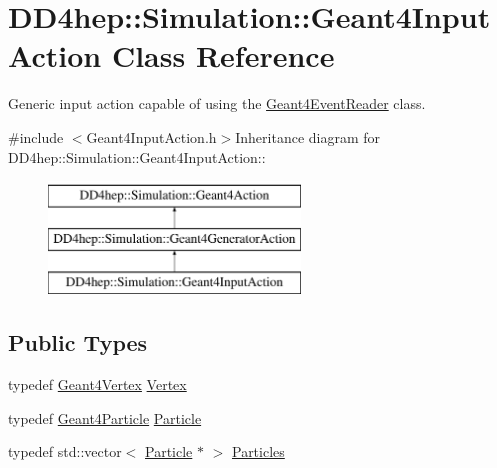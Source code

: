 \hypertarget{class_d_d4hep_1_1_simulation_1_1_geant4_input_action}{
\section{DD4hep::Simulation::Geant4InputAction Class Reference}
\label{class_d_d4hep_1_1_simulation_1_1_geant4_input_action}
}


Generic input action capable of using the \hyperlink{class_d_d4hep_1_1_simulation_1_1_geant4_event_reader}{Geant4EventReader} class.  


{\ttfamily \#include $<$Geant4InputAction.h$>$}Inheritance diagram for DD4hep::Simulation::Geant4InputAction::\begin{figure}[H]
\begin{center}
\leavevmode
\includegraphics[height=3cm]{class_d_d4hep_1_1_simulation_1_1_geant4_input_action}
\end{center}
\end{figure}
\subsection*{Public Types}
\begin{DoxyCompactItemize}
\item 
typedef \hyperlink{class_d_d4hep_1_1_simulation_1_1_geant4_vertex}{Geant4Vertex} \hyperlink{class_d_d4hep_1_1_simulation_1_1_geant4_input_action_a0bcc23935dc55574b02d9ee4514eabc8}{Vertex}
\item 
typedef \hyperlink{class_d_d4hep_1_1_simulation_1_1_geant4_particle}{Geant4Particle} \hyperlink{class_d_d4hep_1_1_simulation_1_1_geant4_input_action_ab8d227297b50dec5cb769635da56deec}{Particle}
\item 
typedef std::vector$<$ \hyperlink{class_d_d4hep_1_1_simulation_1_1_geant4_particle}{Particle} $\ast$ $>$ \hyperlink{class_d_d4hep_1_1_simulation_1_1_geant4_input_action_ae62b1f5e1be390991dd228e7bb7bcc04}{Particles}
\end{DoxyCompactItemize}
